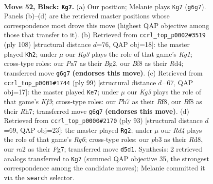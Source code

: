 \documentclass[11pt]{article}
\begin{document}
\clearpage

\begin{figure}[p]\centering
\begin{subfigure}{0.46\textwidth}\centering
\resizebox{\linewidth}{!}{%
\newchessgame
\chessboard[
  setfen={5b1r/p4n1p/P5k1/3r4/5B2/1Pp3KP/R1P3P1/2RB4 b - - 12 52},
  showmover=false,
  pgfstyle=straightmove, color=movearrow, markmove={g6-g7}
]}
\caption{}
\end{subfigure}\hfill
\begin{subfigure}{0.46\textwidth}\centering
\resizebox{\linewidth}{!}{%
\newchessgame
\chessboard[
  setfen={2r1b3/r4pkp/3P2p1/4R3/3R4/6P1/5PB1/6K1 w - - 5 55},
  showmover=false,
  pgfstyle=straightmove, color=movearrow, markmove={g1-h2}
]}
\caption{}
\end{subfigure}
\\[4pt]
\begin{subfigure}{0.46\textwidth}\centering
\resizebox{\linewidth}{!}{%
\newchessgame
\chessboard[
  setfen={5r2/p6r/1p1p1k2/2pBn3/P1P5/1KP3R1/6P1/1R6 b - - 45 50},
  showmover=false,
  pgfstyle=straightmove, color=movearrow, markmove={f6-e7}
]}
\caption{}
\end{subfigure}\hfill
\begin{subfigure}{0.46\textwidth}\centering
\resizebox{\linewidth}{!}{%
\newchessgame
\chessboard[
  setfen={3r4/1kp3p1/p7/1p2P3/3P1R1P/P1B3r1/KPP5/8 b - - 2 47},
  showmover=false,
  pgfstyle=straightmove, color=movearrow, markmove={g3-g2}
]}
\caption{}
\end{subfigure}
\caption{\textbf{Move 52, Black: \texttt{Kg7}.} (a) Our position; Melanie plays \texttt{Kg7} (\texttt{g6g7}). Panels (b)--(d) are the retrieved master positions whose correspondence most drove this move (highest QAP objective among those that transfer to it). (b) Retrieved from \texttt{ccrl\_top\_p0002\#3519} (ply 108) [structural distance $d$=76, QAP obj=18]: the master played \texttt{Kh2}; under $\mu$ our \emph{Kg3} plays the role of that game's \emph{Kg1}; cross-type roles: our \emph{P}a7 as their \emph{B}g2, our \emph{B}f8 as their \emph{R}d4; transferred move \texttt{g6g7} \textbf{(endorses this move)}. (c) Retrieved from \texttt{ccrl\_top\_p0001\#1744} (ply 99) [structural distance $d$=67, QAP obj=17]: the master played \texttt{Ke7}; under $\mu$ our \emph{Kg3} plays the role of that game's \emph{Kf3}; cross-type roles: our \emph{P}h7 as their \emph{R}f8, our \emph{B}f8 as their \emph{R}h7; transferred move \texttt{g6g7} \textbf{(endorses this move)}. (d) Retrieved from \texttt{ccrl\_top\_p0000\#2170} (ply 93) [structural distance $d$=69, QAP obj=23]: the master played \texttt{Rg2}; under $\mu$ our \emph{Rd4} plays the role of that game's \emph{Rg6}; cross-type roles: our \emph{p}b3 as their \emph{R}d8, our \emph{r}a2 as their \emph{P}g7; transferred move \texttt{d5d1}. Synthesis: 2 retrieved analogs transferred to \texttt{Kg7} (summed QAP objective 35, the strongest correspondence among the candidate moves); Melanie committed it via the \texttt{search} selector.}
\label{fig:thought-m103}
\end{figure}
\end{document}
